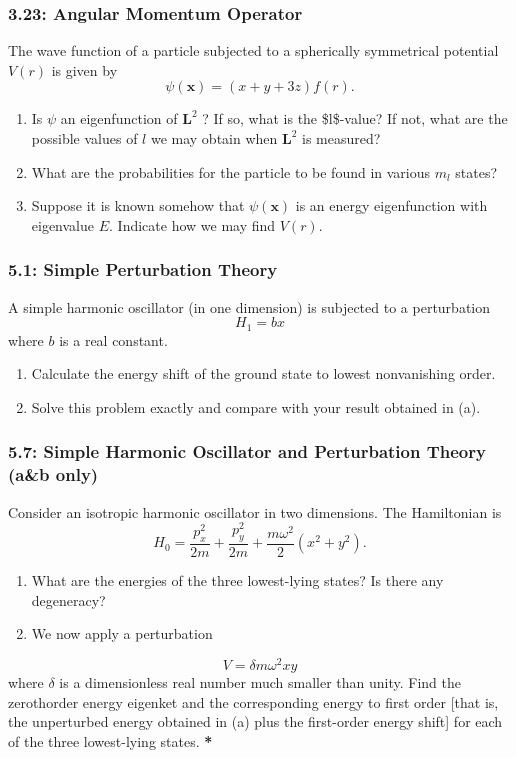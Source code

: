 \documentclass[11pt]{article}
\begin{document}
\subsubsection{3.23: Angular Momentum Operator}
\label{sec:orgfa95b1b}
The wave function of a particle subjected to a spherically symmetrical
potential \(V(r)\) is given by $$ \psi(\mathbf{x})=(x+y+3 z) f(r) . $$
\begin{enumerate}
\item Is \(\psi\) an eigenfunction of \(\mathbf{L}^2\) ? If so, what is the \$l\$-value?
If not, what are the possible values of \(l\) we may obtain when \(\mathbf{L}^2\)
is measured?
\item What are the probabilities for the particle to be found in various \(m_l\)
states?
\item Suppose it is known somehow that \(\psi(\mathbf{x})\) is an energy
eigenfunction with eigenvalue \(E\). Indicate how we may find \(V(r)\).
\end{enumerate}
\subsubsection{5.1: Simple Perturbation Theory}
\label{sec:org9ddfe8a}
A simple harmonic oscillator (in one dimension) is subjected to a perturbation
$$
H_1=b x
$$
where \(b\) is a real constant.
\begin{enumerate}
\item Calculate the energy shift of the ground state to lowest nonvanishing order.
\item Solve this problem exactly and compare with your result obtained in (a).
\end{enumerate}
\subsubsection{5.7: Simple Harmonic Oscillator and Perturbation Theory (a\&b only)}
\label{sec:orgdda4e81}
Consider an isotropic harmonic oscillator in two dimensions. The Hamiltonian is
$$ H_0=\frac{p_x^2}{2 m}+\frac{p_y^2}{2 m}+\frac{m
\omega^2}{2}\left(x^2+y^2\right) . $$
\begin{enumerate}
\item What are the energies of the three lowest-lying states? Is there any
degeneracy?
\item We now apply a perturbation
\end{enumerate}
$$ V=\delta m \omega^2 x y $$ where \(\delta\) is a dimensionless real number much
smaller than unity. Find the zerothorder energy eigenket and the corresponding
energy to first order [that is, the unperturbed energy obtained in (a) plus the
first-order energy shift] for each of the three lowest-lying states.
\textbf{*}
\end{document}
